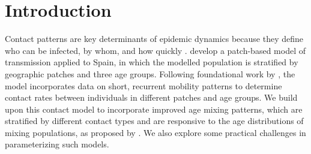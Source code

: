\section{Introduction}\label{intro}
Contact patterns are key determinants of epidemic dynamics
because they define who can be infected, by whom, and how quickly \cite{Mossong2008}.
\citet{Arenas2020} develop a patch-based model of \covid transmission applied to Spain,
in which the modelled population is stratified by geographic patches and three age groups.
Following foundational work by \citet{Balcan2011,Sattenspiel1995},
the model incorporates data on short, recurrent mobility patterns
to determine contact rates between individuals in different patches and age groups.
We build upon this contact model to incorporate improved age mixing patterns,
which are stratified by different contact types and are responsive to
the age distributions of mixing populations, as proposed by \citet{Arregui2018}.
We also explore some practical challenges in parameterizing such models.
